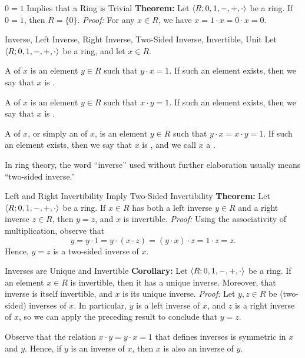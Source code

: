\documentclass[12pt]{report}
\begin{document}
\begin{thmbox}{$0=1$ Implies that a Ring is Trivial}
	\textbf{Theorem:} Let ${\langle {R; 0, 1, -, +, \cdot} \rangle}$ be a ring. If $0 = 1$, then $R = \{0\}$.
\tcblower
	\textit{Proof:} For any $x \in R$, we have $x = 1 \cdot x = 0 \cdot x = 0$.
\end{thmbox}

\begin{dfnbox}{Inverse, Left Inverse, Right Inverse, Two-Sided Inverse, Invertible, Unit}
	Let ${\langle {R; 0, 1, -, +, \cdot} \rangle}$ be a ring, and let $x \in R$.
	\begin{dfnitems}
		\item A  of $x$ is an element $y \in R$ such that $y \cdot x = 1$. If such an element exists, then we say that $x$ is .
		\item A  of $x$ is an element $y \in R$ such that $x \cdot y = 1$. If such an element exists, then we say that $x$ is .
		\item A  of $x$, or simply an  of $x$, is an element $y \in R$ such that $y \cdot x = x \cdot y = 1$. If such an element exists, then we say that $x$ is , and we call $x$ a .
	\end{dfnitems}
\end{dfnbox}

In ring theory, the word ``inverse'' used without further elaboration usually means ``two-sided inverse.''

\begin{thmbox}{Left and Right Invertibility Imply Two-Sided Invertibility}
	\textbf{Theorem:} Let ${\langle {R; 0, 1, -, +, \cdot} \rangle}$ be a ring. If $x \in R$ has both a left inverse $y \in R$ and a right inverse $z \in R$, then $y = z$, and $x$ is invertible.
\tcblower
	\textit{Proof:} Using the associativity of multiplication, observe that
	\[ y = y \cdot 1 = y \cdot (x \cdot z) = (y \cdot x) \cdot z = 1 \cdot z = z. \]
	Hence, $y = z$ is a two-sided inverse of $x$.
\end{thmbox}

\begin{thmbox}{Inverses are Unique and Invertible}
	\textbf{Corollary:} Let ${\langle {R; 0, 1, -, +, \cdot} \rangle}$ be a ring. If an element $x \in R$ is invertible, then it has a unique inverse. Moreover, that inverse is itself invertible, and $x$ is its unique inverse.
\tcblower
	\textit{Proof:} Let $y,z \in R$ be (two-sided) inverses of $x$. In particular, $y$ is a left inverse of $x$, and $z$ is a right inverse of $x$, so we can apply the preceding result to conclude that $y = z$.

	Observe that the relation $x \cdot y = y \cdot x = 1$ that defines inverses is symmetric in $x$ and $y$. Hence, if $y$ is an inverse of $x$, then $x$ is also an inverse of $y$.
\end{thmbox}
\end{document}

